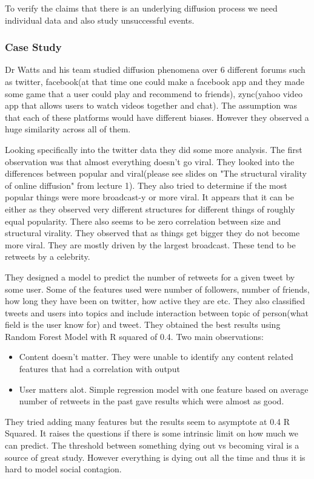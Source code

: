  To verify the claims that there is an underlying diffusion process we need individual data and also study unsuccessful events. 
 
 \subsubsection{Case Study}
 Dr Watts and his team studied diffusion phenomena over 6 different forums such as twitter, facebook(at that time one could make a facebook app and they made some game that a user could play and recommend to friends), zync(yahoo video app that allows users to watch videos together and chat). The assumption was that each of these platforms would have different biases. However they observed a huge similarity across all of them. 
 
 Looking specifically into the twitter data they did some more analysis. The first observation was that almost everything doesn't go viral. They looked into the differences between popular and viral(please see slides on "The structural virality of online diffusion" from lecture 1). They also tried to determine if the most popular things were more broadcast-y or more viral. It appears that it can be either as they observed very different structures for different things of roughly equal popularity. There also seems to be zero correlation between size and structural virality. They observed that as things get bigger they do not become more viral. They are mostly driven by the largest broadcast. These tend to be retweets by a celebrity. 
 
 They designed a model to predict the number of retweets for a given tweet by some user. Some of the features used were number of followers, number of friends, how long they have been on twitter, how active they are etc. They also classified tweets and users into topics and include interaction between topic of person(what field is the user know for) and tweet. They obtained the best results using Random Forest Model with R squared of 0.4. Two main observations:
  \begin{itemize}
  	\item Content doesn't matter. They were unable to identify any content related features that had a correlation with output 
  	\item User matters alot. Simple regression model with one feature based on average number of retweets in the past gave results which were almost as good.
  \end{itemize}
 They tried adding many features but the results seem to asymptote at 0.4 R Squared. It raises the questions if there is some intrinsic limit on how much we can predict. The threshold between something dying out vs becoming viral is a source of great study. However everything is dying out all the time and thus it is hard to model social contagion. 
 
